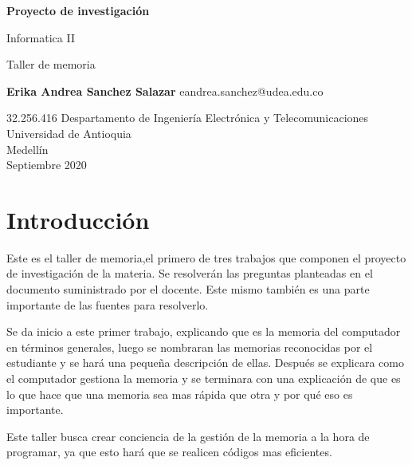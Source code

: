 \documentclass{article}
\begin{document}
\begin{titlepage}
    \begin{center}
        \vspace*{1cm}
            
        \Huge
        \textbf{Proyecto de investigación}
            
        \vspace{0.5cm}
        \LARGE
        Informatica II
        
        Taller de memoria
            
        \vspace{1.5cm}
            
        \textbf{Erika Andrea Sanchez Salazar}
        \LARGE
        eandrea.sanchez@udea.edu.co
        
        32.256.416
        \vfill
        \vspace{0.8cm}
        \Large
        Despartamento de Ingeniería Electrónica y Telecomunicaciones\\
        Universidad de Antioquia\\
        Medellín\\
        Septiembre 2020
           
    \end{center}
\end{titlepage}

\tableofcontents
\newpage
\section{Introducción}\label{intro}

\vspace{0.5cm}
\noindent
Este es el taller de memoria,el primero de tres trabajos que componen el proyecto de investigación de la materia. Se resolverán las preguntas planteadas en el documento suministrado por el docente. Este mismo también es una parte importante de las fuentes para resolverlo. 

\vspace{0.5cm}
\noindent
Se da inicio a este primer trabajo, explicando que es la memoria del computador en términos generales, luego se nombraran las memorias reconocidas por el estudiante y se hará una pequeña descripción de ellas. Después se explicara como el computador gestiona la memoria y se terminara con una explicación de que es lo que hace que una memoria sea mas rápida que otra y por qué eso es importante.

\vspace{0.5cm}
\noindent
Este taller busca crear conciencia de la gestión de la memoria a la hora de programar, ya que esto hará que se realicen códigos mas eficientes.
\end{document}
